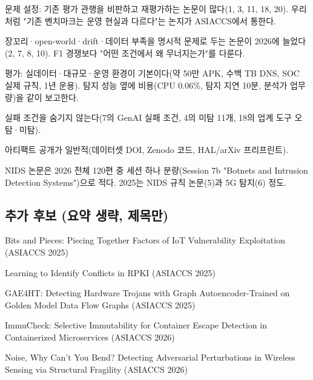 \par\noindent \textbullet\enspace 문제 설정: 기존 평가 관행을 비판하고 재평가하는 논문이 많다(1, 3, 11, 18, 20). 우리처럼 "기존 벤치마크는 운영 현실과 다르다"는 논지가 ASIACCS에서 통한다.


\par\noindent \textbullet\enspace 장꼬리·open-world·drift·데이터 부족을 명시적 문제로 두는 논문이 2026에 늘었다(2, 7, 8, 10). F1 경쟁보다 "어떤 조건에서 왜 무너지는가"를 다룬다.


\par\noindent \textbullet\enspace 평가: 실데이터·대규모·운영 환경이 기본이다(약 50만 APK, 수백 TB DNS, SOC 실제 규칙, 1년 운용). 탐지 성능 옆에 비용(CPU 0.06\%, 탐지 지연 10분, 분석가 업무량)을 같이 보고한다.


\par\noindent \textbullet\enspace 실패 조건을 숨기지 않는다(7의 GenAI 실패 조건, 4의 미탐 11개, 18의 업계 도구 오탐·미탐).


\par\noindent \textbullet\enspace 아티팩트 공개가 일반적(데이터셋 DOI, Zenodo 코드, HAL/\allowbreak{}arXiv 프리프린트).


\par\noindent \textbullet\enspace NIDS 논문은 2026 전체 120편 중 세션 하나 분량(Session 7b "Botnets and Intrusion Detection Systems")으로 적다. 2025는 NIDS 규칙 논문(5)과 5G 탐지(6) 정도.


\subsection{추가 후보 (요약 생략, 제목만)}
\par\noindent \textbullet\enspace Bits and Pieces: Piecing Together Factors of IoT Vulnerability Exploitation (ASIACCS 2025)


\par\noindent \textbullet\enspace Learning to Identify Conflicts in RPKI (ASIACCS 2025)


\par\noindent \textbullet\enspace GAE4HT: Detecting Hardware Trojans with Graph Autoencoder-Trained on Golden Model Data Flow Graphs (ASIACCS 2025)


\par\noindent \textbullet\enspace ImmuCheck: Selective Immutability for Container Escape Detection in Containerized Microservices (ASIACCS 2026)


\par\noindent \textbullet\enspace Noise, Why Can't You Bend? Detecting Adversarial Perturbations in Wireless Sensing via Structural Fragility (ASIACCS 2026)




